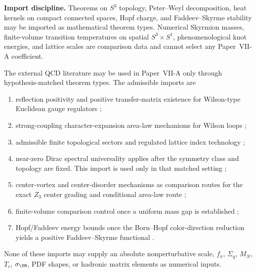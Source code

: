 \documentclass[12pt,a4paper]{article}
\begin{document}
\textbf{Import discipline.}
Theorems on \(S^3\) topology, Peter--Weyl decomposition, heat kernels on compact connected spaces, Hopf charge, and Faddeev--Skyrme stability may be imported as mathematical theorem types.  Numerical Skyrmion masses, finite-volume transition temperatures on spatial \(S^3\times S^1\), phenomenological knot energies, and lattice scales are comparison data and cannot select any Paper~VII-A coefficient.
\begin{theorem}
\label{p10:thm:external-theorem-bank-import-map}
The external QCD literature may be used in Paper~VII-A only through
hypothesis-matched theorem types.  The admissible imports are
\begin{enumerate}[label=(\roman*), leftmargin=2.0em]
\item reflection positivity and positive transfer-matrix existence for
Wilson-type Euclidean gauge regulators
\cite{OsterwalderSeiler1978,MenottiPelissetto1987};

\item strong-coupling character-expansion area-law mechanisms for Wilson loops
\cite{Wilson1974,KogutSusskind1975,OsterwalderSeiler1978};

\item admissible finite topological sectors and regulated lattice index
technology \cite{Luscher1982Topology,GinspargWilson1982,Neuberger1998};

\item near-zero Dirac spectral universality applies after the symmetry class and
topology are fixed.  This import is used only in that matched setting
\cite{LeutwylerSmilga1992,Verbaarschot1994};

\item center-vortex and center-disorder mechanisms as comparison routes for the
exact \(Z_3\) center grading and conditional area-law route
\cite{tHooft1978,Greensite2003};

\item finite-volume comparison control once a uniform mass gap is established
\cite{Luscher1986Volume};

\item Hopf/Faddeev energy bounds once the Born--Hopf color-direction reduction
yields a positive Faddeev--Skyrme functional
\cite{FaddeevNiemi1997,VakulenkoKapitanskii1979}.
\end{enumerate}
None of these imports may supply an absolute nonperturbative scale, \(f_\pi\), \(\Sigma_q\),
\(M_N\), \(T_c\), \(\sigma_{\YM}\), PDF shapes, or hadronic matrix elements as
numerical inputs.
\end{theorem}
\end{document}
